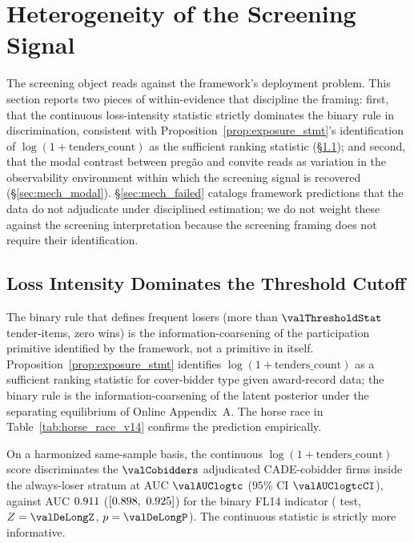 \section{Heterogeneity of the Screening Signal}
\label{sec:mechanisms}

The screening object reads against the framework's deployment
problem. This section reports two pieces of within-evidence that
discipline the framing: first, that the continuous loss-intensity
statistic strictly dominates the binary rule in discrimination,
consistent with Proposition~\ref{prop:exposure_stmt}'s identification
of $\log(1+\text{tenders\_count})$ as the sufficient ranking
statistic (\S\ref{sec:mech_horse_race}); and second, that the
modal contrast between preg\~ao and convite reads as variation in
the observability environment within which the screening signal
is recovered (\S\ref{sec:mech_modal}). \S\ref{sec:mech_failed}
catalogs framework predictions that the data do not adjudicate
under disciplined estimation; we do not weight these against the
screening interpretation because the screening framing does not
require their identification.

\subsection{Loss Intensity Dominates the Threshold Cutoff}
\label{sec:mech_horse_race}

The binary rule that defines frequent losers (more
than $\valThresholdStat$ tender-items, zero wins) is the
information-coarsening of the participation primitive
identified by the framework, not a primitive in itself.
Proposition~\ref{prop:exposure_stmt} identifies
$\log(1+\text{tenders\_count})$ as a sufficient ranking statistic
for cover-bidder type given award-record data; the binary rule is
the information-coarsening of the latent posterior under the
separating equilibrium of Online Appendix~A. The horse race in
Table~\ref{tab:horse_race_v14} confirms the prediction empirically.



On a harmonized same-sample basis, the continuous
$\log(1+\text{tenders\_count})$ score discriminates the
$\valCobidders$ adjudicated CADE-cobidder firms inside the
always-loser stratum at AUC $\valAUClogtc$ ($95\%$ CI
$\valAUClogtcCI$), against AUC $0.911$
($[0.898,\ 0.925]$) for the binary FL14 indicator
(\citealt{delong1988comparing} test, $Z = \valDeLongZ$,
$p = \valDeLongP$). The continuous statistic is strictly more
informative.


